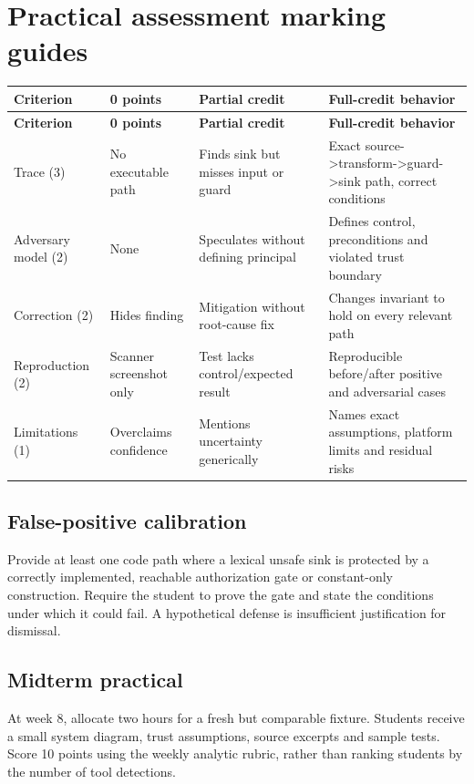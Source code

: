 \documentclass[10pt,letterpaper]{article}
\begin{document}
\section{Practical assessment marking guides}
\begingroup\footnotesize\setlength\tabcolsep{3pt}
\begin{longtable}{>{\raggedright\arraybackslash}p{}>{\raggedright\arraybackslash}p{}>{\raggedright\arraybackslash}p{}>{\raggedright\arraybackslash}p{}}\toprule
\textbf{Criterion} & \textbf{0 points} & \textbf{Partial credit} & \textbf{Full-credit behavior}\\\midrule\endfirsthead
\toprule \textbf{Criterion} & \textbf{0 points} & \textbf{Partial credit} & \textbf{Full-credit behavior}\\\midrule\endhead
Trace (3) & No executable path & Finds sink but misses input or guard & Exact source->transform->guard->sink path, correct conditions\\\midrule
Adversary model (2) & None & Speculates without defining principal & Defines control, preconditions and violated trust boundary\\\midrule
Correction (2) & Hides finding & Mitigation without root-cause fix & Changes invariant to hold on every relevant path\\\midrule
Reproduction (2) & Scanner screenshot only & Test lacks control/expected result & Reproducible before/after positive and adversarial cases\\\midrule
Limitations (1) & Overclaims confidence & Mentions uncertainty generically & Names exact assumptions, platform limits and residual risks\\\midrule
\bottomrule\end{longtable}\endgroup
\subsection{False-positive calibration}
Provide at least one code path where a lexical unsafe sink is protected by a correctly implemented, reachable authorization gate or constant-only construction. Require the student to prove the gate and state the conditions under which it could fail. A hypothetical defense is insufficient justification for dismissal.

\subsection{Midterm practical}
At week 8, allocate two hours for a fresh but comparable fixture. Students receive a small system diagram, trust assumptions, source excerpts and sample tests. Score 10 points using the weekly analytic rubric, rather than ranking students by the number of tool detections.
\end{document}
